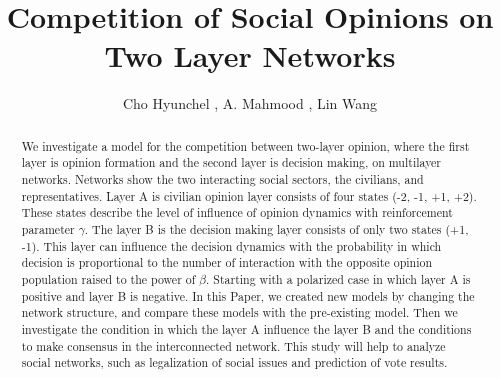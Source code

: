 \documentclass[english]{cccconf}
\begin{document}
\title{Competition of Social Opinions on Two Layer Networks}


\author{Cho Hyunchel ,
        A. Mahmood ,
        Lin Wang }

\maketitle

\begin{abstract}
We investigate a model for the competition between two-layer opinion, where the first layer is opinion formation and the second layer is decision making, on multilayer networks. Networks show the two interacting social sectors, the civilians, and representatives. Layer A is civilian opinion layer consists of four states (-2, -1, +1, +2). These states describe the level of influence of opinion dynamics with reinforcement parameter $\gamma$. The layer B is the decision making layer consists of only two states (+1, -1).  This layer can influence the decision dynamics with the probability in which decision is proportional to the number of interaction with the opposite opinion population raised to the power of $\beta$. Starting with a polarized case in which layer A is positive and layer B is negative. In this Paper, we created new models by changing the network structure, and compare these models with the pre-existing model. Then we investigate the condition in which the layer A influence the layer B and the conditions to make consensus in the interconnected network.  This study will help to analyze social networks, such as legalization of social issues and prediction of vote results.
\end{abstract}
\end{document}
